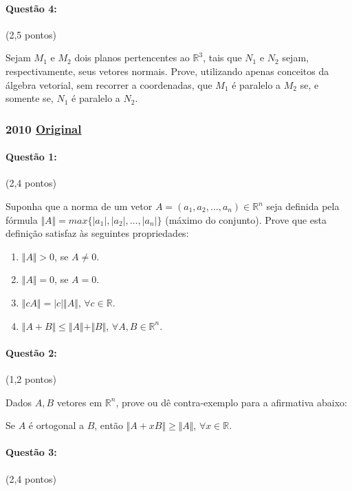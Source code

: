 \documentclass[12pt,a4paper]{article}
\newcommand{\original}[1]{\tiny \href{#1}{Original} \normalsize}
\begin{document}
\paragraph{Questão 4:} (2,5 pontos) 

Sejam $M_1$ e $M_2$ dois planos pertencentes ao $\mathbb{R}^3$, tais que $N_1$ e $N_2$ sejam, respectivamente, seus vetores normais. Prove, utilizando apenas conceitos da álgebra vetorial, sem recorrer a coordenadas, que $M_1$ é paralelo a $M_2$ se, e somente se, $N_1$ é paralelo a $N_2$.

\newpage
\footnotesize
\subsubsection{2010 \original{https://drive.google.com/file/d/1iAPdKxS7dN4f7A9y3lARavMJEqBFKsgg/view?usp=sharing} }

\paragraph{Questão 1:} (2,4 pontos)

Suponha que a norma de um vetor $A=(a_1,a_2,\dots,a_n) \in \mathbb{R}^n$ seja definida pela fórmula $\Vert A \Vert = max\{\vert a_1 \vert, \vert a_2 \vert,\dots,\vert a_n \vert \}$ (máximo do conjunto). Prove que esta definição satisfaz às seguintes propriedades:

\begin{enumerate}[label=(\alph*)]
\item $\Vert A \Vert >0$, se $A \neq 0$.
\item $\Vert A \Vert =0$, se $A=0$.
\item $\Vert cA \Vert = \vert c \vert \Vert A \Vert$, $\forall c \in \mathbb{R}$.
\item $\Vert A+B \Vert \leq \Vert A \Vert + \Vert B \Vert$, $\forall A,B \in \mathbb{R}^n$.
\end{enumerate}

\paragraph{Questão 2:} (1,2 pontos) 

Dados $A,B$ vetores em $\mathbb{R}^n$, prove ou dê contra-exemplo para a afirmativa abaixo:

Se $A$ é ortogonal a $B$, então $\Vert A+xB \Vert \geq \Vert A \Vert$, $\forall x \in \mathbb{R}$.

\paragraph{Questão 3:} (2,4 pontos) 
\end{document}
